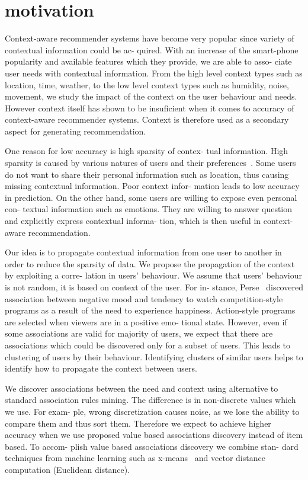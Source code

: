 \documentclass{acm_proc_article-sp} %
\begin{document}
\section{motivation}

Context-aware recommender systems have become very
popular since variety of contextual information could be ac-
quired. With an increase of the smart-phone popularity and
available features which they provide, we are able to asso-
ciate user needs with contextual information. From the high
level context types such as location, time, weather, to the
low level context types such as humidity, noise, movement,
we study the impact of the context on the user behaviour and
needs. However context itself has shown to be insuficient
when it comes to accuracy of context-aware recommender
systems. Context is therefore used as a secondary aspect for
generating recommendation.\par One reason for low accuracy is high sparsity of contex-
tual information. High sparsity is caused by various natures
of users and their preferences~\cite{carlson2011wide}. Some users do not want
to share their personal information such as location, thus
causing missing contextual information. Poor context infor-
mation leads to low accuracy in prediction. On the other
hand, some users are willing to expose even personal con-
textual information such as emotions. They are willing to
answer question and explicitly express contextual informa-
tion, which is then useful in context-aware recommendation.

Our idea is to propagate contextual information from one
user to another in order to reduce the sparsity of data. We
propose the propagation of the context by exploiting a corre-
lation in users' behaviour. We assume that users' behaviour
is not random, it is based on context of the user. For in-
stance, Perse~\cite{perse1998implications} discovered association between negative
mood and tendency to watch competition-style programs as
a result of the need to experience happiness. Action-style
programs are selected when viewers are in a positive emo-
tional state. However, even if some associations are valid
for majority of users, we expect that there are associations
which could be discovered only for a subset of users. This
leads to clustering of users by their behaviour. Identifying
clusters of similar users helps to identify how to propagate
the context between users.

We discover associations between the need and context
using alternative to standard association rules mining. The
difference is in non-discrete values which we use. For exam-
ple, wrong discretization causes noise, as we lose the ability
to compare them and thus sort them. Therefore we expect to
achieve higher accuracy when we use proposed value based
associations discovery instead of item based. To accom-
plish value based associations discovery we combine stan-
dard techniques from machine learning such as x-means~\cite{pelleg2000x}
and vector distance computation (Euclidean distance).
\end{document}
